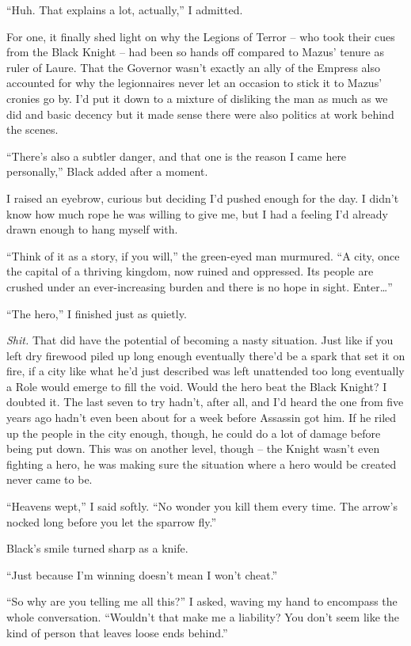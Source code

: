 \documentclass[12pt, openany]{book}
\begin{document}
“Huh. That explains a lot, actually,” I admitted.

For one, it finally shed light on why the Legions of Terror – who took their cues from the Black Knight – had been so hands off compared to Mazus’ tenure as ruler of Laure. That the Governor wasn’t exactly an ally of the Empress also accounted for why the legionnaires never let an occasion to stick it to Mazus’ cronies go by. I’d put it down to a mixture of disliking the man as much as we did and basic decency but it made sense there were also politics at work behind the scenes.

“There’s also a subtler danger, and that one is the reason I came here personally,” Black added after a moment.

I raised an eyebrow, curious but deciding I’d pushed enough for the day. I didn’t know how much rope he was willing to give me, but I had a feeling I’d already drawn enough to hang myself with.

“Think of it as a story, if you will,” the green-eyed man murmured. “A city, once the capital of a thriving kingdom, now ruined and oppressed. Its people are crushed under an ever-increasing burden and there is no hope in sight. Enter…”

“The hero,” I finished just as quietly.

\textit{Shit.} That did have the potential of becoming a nasty situation. Just like if you left dry firewood piled up long enough eventually there’d be a spark that set it on fire, if a city like what he’d just described was left unattended too long eventually a Role would emerge to fill the void. Would the hero beat the Black Knight? I doubted it. The last seven to try hadn’t, after all, and I’d heard the one from five years ago hadn’t even been about for a week before Assassin got him. If he riled up the people in the city enough, though, he could do a lot of damage before being put down. This was on another level, though – the Knight wasn’t even fighting a hero, he was making sure the situation where a hero would be created never came to be.

“Heavens wept,” I said softly. “No wonder you kill them every time. The arrow’s nocked long before you let the sparrow fly.”

Black’s smile turned sharp as a knife.

“Just because I’m winning doesn’t mean I won’t cheat.”

“So why are you telling me all this?” I asked, waving my hand to encompass the whole conversation. “Wouldn’t that make me a liability? You don’t seem like the kind of person that leaves loose ends behind.”
\end{document}
